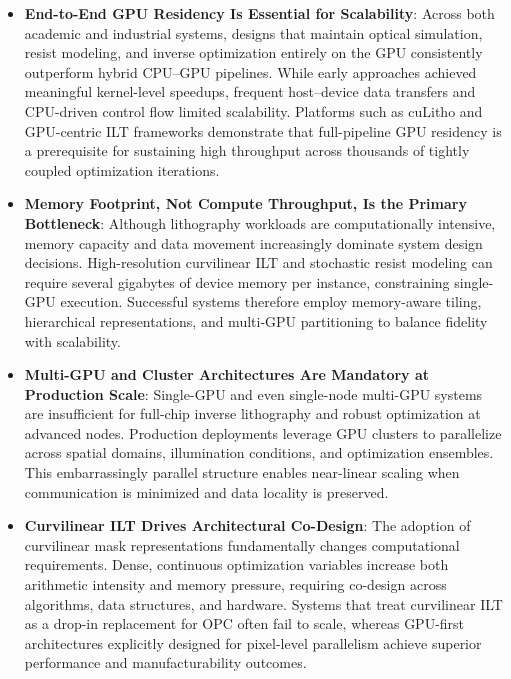 \documentclass[pdflatex,sn-mathphys-num]{sn-jnl}%
\theoremstyle{thmstyleone}%
\theoremstyle{thmstyletwo}%
\theoremstyle{thmstylethree}%
\begin{document}
\begin{itemize}
	\item \textbf{End-to-End GPU Residency Is Essential for Scalability}: Across both academic and industrial systems, designs that maintain optical simulation, resist modeling, and inverse optimization entirely on the GPU consistently outperform hybrid CPU–GPU pipelines. While early approaches achieved meaningful kernel-level speedups, frequent host–device data transfers and CPU-driven control flow limited scalability. Platforms such as cuLitho and GPU-centric ILT frameworks demonstrate that full-pipeline GPU residency is a prerequisite for sustaining high throughput across thousands of tightly coupled optimization iterations.
	
	\item \textbf{Memory Footprint, Not Compute Throughput, Is the Primary Bottleneck}: Although lithography workloads are computationally intensive, memory capacity and data movement increasingly dominate system design decisions. High-resolution curvilinear ILT and stochastic resist modeling can require several gigabytes of device memory per instance, constraining single-GPU execution. Successful systems therefore employ memory-aware tiling, hierarchical representations, and multi-GPU partitioning to balance fidelity with scalability.

\item \textbf{Multi-GPU and Cluster Architectures Are Mandatory at Production Scale}: Single-GPU and even single-node multi-GPU systems are insufficient for full-chip inverse lithography and robust optimization at advanced nodes. Production deployments leverage GPU clusters to parallelize across spatial domains, illumination conditions, and optimization ensembles. This embarrassingly parallel structure enables near-linear scaling when communication is minimized and data locality is preserved.

\item \textbf{Curvilinear ILT Drives Architectural Co-Design}: The adoption of curvilinear mask representations fundamentally changes computational requirements. Dense, continuous optimization variables increase both arithmetic intensity and memory pressure, requiring co-design across algorithms, data structures, and hardware. Systems that treat curvilinear ILT as a drop-in replacement for OPC often fail to scale, whereas GPU-first architectures explicitly designed for pixel-level parallelism achieve superior performance and manufacturability outcomes.


\end{itemize}
\end{document}
